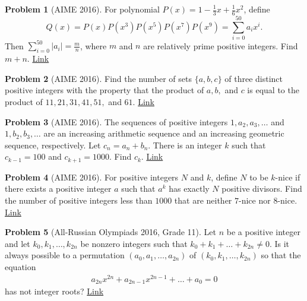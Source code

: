 \documentclass[]{article}
\theoremstyle{definition}
\newtheorem{problem}{Problem}
\begin{document}
	
\begin{problem}[AIME 2016]
	 For polynomial $P(x)=1-\frac{1}{3}x+\frac{1}{6}x^2$, define \[ Q(x) = P(x)P(x^3)P(x^5)P(x^7)P(x^9) = \sum\limits_{i=0}^{50}a_ix^i. \]Then $\sum\limits_{i=0}^{50}|a_i|=\frac{m}{n}$, where $m$ and $n$ are relatively prime positive integers. Find $m+n$. \hfill \href{http://artofproblemsolving.com/community/c5h1213127p6023562}{Link}
\end{problem}


\begin{problem}[AIME 2016]
	Find the number of sets $\{a,b,c\}$ of three distinct positive integers with the property that the product of $a,b,$ and $c$ is equal to the product of $11,21,31,41,51,$ and $61$. \hfill \href{http://artofproblemsolving.com/community/c5h1213129p6023597}{Link}
\end{problem}
	
	
\begin{problem}[AIME 2016]
	The sequences of positive integers $1,a_2,a_3,\ldots$ and $1,b_2,b_3,\ldots$ are an increasing arithmetic sequence and an increasing geometric sequence, respectively. Let $c_n=a_n+b_n$. There is an integer $k$ such that $c_{k-1}=100$ and $c_{k+1}=1000$. Find $c_k$. \hfill \href{http://artofproblemsolving.com/community/c5h1213132p6023608}{Link}
\end{problem}


	
\begin{problem}[AIME 2016]
	For positive integers $N$ and $k$, define $N$ to be $k$-nice if there exists a positive integer $a$ such that $a^k$ has exactly $N$ positive divisors. Find the number of positive integers less than $1000$ that are neither $7$-nice nor $8$-nice. \flushright \href{http://artofproblemsolving.com/community/c5h1213134p6023621}{Link}
\end{problem}


\begin{problem}[All-Russian Olympiads 2016, Grade 11]
	Let $n$ be a positive integer and let $k_0,k_1, \dots,k_{2n}$ be nonzero integers such that $k_0+k_1 +\dots+k_{2n}\neq 0$. Is it always possible to a permutation $(a_0,a_1,\dots,a_{2n})$ of $(k_0,k_1,\dots,k_{2n})$ so that the equation
	\begin{align*} a_{2n}x^{2n}+a_{2n-1}x^{2n-1}+\dots+a_0=0 \end{align*}has not integer roots? \hfill \href{http://artofproblemsolving.com/community/c6h1238101p6307084}{Link}
\end{problem}
\end{document}
